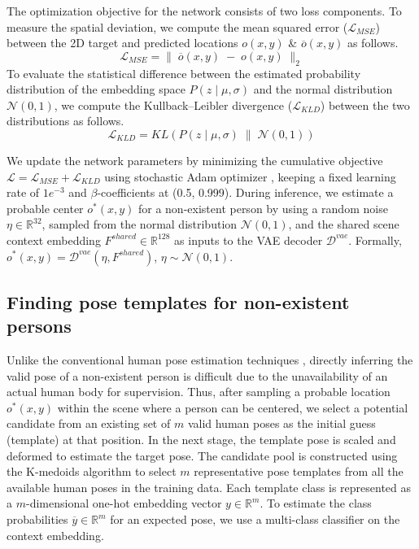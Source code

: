 The optimization objective for the network consists of two loss components. To measure the spatial deviation, we compute the mean squared error ($\mathcal{L}_{MSE}$) between the 2D target and predicted locations $o(x, y)$ \& $\overline{o}(x, y)$ as follows.
\[
\mathcal{L}_{MSE} = \| \; \overline{o}(x, y) \; - \; o(x, y) \; \|_2
\]
To evaluate the statistical difference between the estimated probability distribution of the embedding space $P(z \; | \; \mu, \sigma)$ and the normal distribution $\mathcal{N}(0, 1)$, we compute the Kullback–Leibler divergence \cite{kullback1951information} ($\mathcal{L}_{KLD}$) between the two distributions as follows.
\[
\mathcal{L}_{KLD} = KL \left( P(z \; | \; \mu, \sigma) \; \| \; \mathcal{N}(0, 1) \right)
\]

We update the network parameters by minimizing the cumulative objective $\mathcal{L} = \mathcal{L}_{MSE} + \mathcal{L}_{KLD}$ using stochastic Adam optimizer \cite{kingma2015adam}, keeping a fixed learning rate of $1e^{-3}$ and $\beta$-coefficients at (0.5, 0.999). During inference, we estimate a probable center $o^*(x, y)$ for a non-existent person by using a random noise $\eta \in \mathbb{R}^{32}$, sampled from the normal distribution $\mathcal{N}(0, 1)$, and the shared scene context embedding $F^{shared} \in \mathbb{R}^{128}$ as inputs to the VAE decoder $\mathcal{D}^{vae}$. Formally, $o^*(x, y) = \mathcal{D}^{vae}(\eta, F^{shared})$, $\eta \sim \mathcal{N}(0, 1)$.

\subsection{Finding pose templates for non-existent persons}
\label{sec:method_pose}
Unlike the conventional human pose estimation techniques \cite{cao2017realtime, sun2019deep, xu2022vitpose, geng2023human}, directly inferring the valid pose of a non-existent person is difficult \cite{roy2022scene} due to the unavailability of an actual human body for supervision. Thus, after sampling a probable location $o^*(x, y)$ within the scene where a person can be centered, we select a potential candidate from an existing set of $m$ valid human poses as the initial guess (template) at that position. In the next stage, the template pose is scaled and deformed to estimate the target pose. The candidate pool is constructed using the K-medoids algorithm \cite{park2009simple} to select $m$ representative pose templates from all the available human poses in the training data. Each template class is represented as a $m$-dimensional one-hot embedding vector $y \in \mathbb{R}^m$. To estimate the class probabilities $\overline{y} \in \mathbb{R}^m$ for an expected pose, we use a multi-class classifier on the context embedding.

